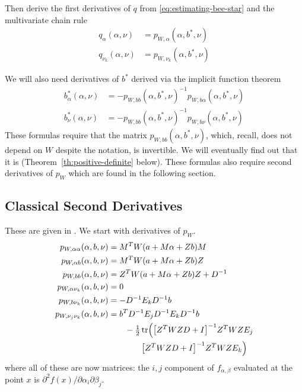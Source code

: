 Then \citet[Section~1.7]{reaster-tr} derive the first derivatives of $q$
from \eqref{eq:estimating-bee-star} and the multivariate chain rule
\begin{align}
   q_\alpha(\alpha, \nu)
   & =
   p_{W, \alpha}(\alpha, b^*, \nu)
   \label{eq:q-alpha}
   \\
   q_{\nu_k}(\alpha, \nu)
   & =
   p_{W, \nu_k}(\alpha, b^*, \nu)
   \label{eq:q-nu-k}
\end{align}

We will also need derivatives of $b^*$ derived via the implicit function
theorem \citep[Section~1.8]{reaster}
\begin{align}
   b^*_\alpha(\alpha, \nu)
   & =
   -
   p_{W, b b}(\alpha, b^*, \nu)^{-1} p_{W, b \alpha}(\alpha, b^*, \nu)
   \label{eq:bee-star-alpha}
   \\
   b^*_{\nu}(\alpha, \nu)
   & =
   -
   p_{W, b b}(\alpha, b^*, \nu)^{-1} p_{W, b \nu}(\alpha, b^*, \nu)
   \label{eq:bee-star-nu}
\end{align}
These formulas require that the matrix $p_{W, b b}(\alpha, b^*, \nu)$,
which, recall, does not depend on $W$ despite the notation,
is invertible.  We will eventually find out that it is
(Theorem~\ref{th:positive-definite} below).
These formulas also require second derivatives of $p_W$ which are found
in the following section.

\subsection{Classical Second Derivatives}

These are given in \citet[Section~1.8]{reaster-tr}.
We start with derivatives of $p_W$.
\begin{align*}
   p_{W,\alpha \alpha}(\alpha, b, \nu)
   & =
   M^T W(a + M \alpha + Z b) M
   \\
   p_{W, \alpha b}(\alpha, b, \nu)
   & =
   M^T W(a + M \alpha + Z b) Z
   \\
   p_{W, b b}(\alpha, b, \nu)
   & =
   Z^T W(a + M \alpha + Z b) Z + D^{- 1}
   \\
   p_{W, \alpha \nu_k}(\alpha, b, \nu)
   & =
   0
   \\
   p_{W, b \nu_k}(\alpha, b, \nu)
   & =
   - D^{- 1} E_k D^{- 1} b
   \\
   p_{W, \nu_j \nu_k}(\alpha, b, \nu)
   & =
   b^T D^{- 1} E_j D^{- 1} E_k D^{- 1} b
   \\
   & \qquad
   -
   \tfrac{1}{2} \operatorname{tr} \Bigl(
   \bigl[ Z^T W Z D + I \bigr]^{- 1}
   Z^T W Z E_j
   \\
   & \qquad \qquad
   \bigl[ Z^T W Z D + I \bigr]^{- 1}
   Z^T W Z E_k
   \Bigr)
\end{align*}
where all of these are now matrices: the $i, j$ component
of $f_{\alpha, \beta}$ evaluated at the point $x$ is
$\partial^2 f(x) / \partial \alpha_i \partial \beta_j$.

